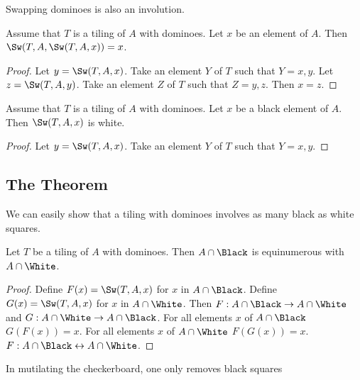 Swapping dominoes is also an involution.

\begin{forthel}
    \begin{lemma}
        Assume that $T$ is a tiling of $A$ with dominoes. Let $x$ be an element of $A$.
        Then $\Sw(T,A,\Sw(T,A,x)) = x$.
    \end{lemma}
    \begin{proof}
        Let $y = \Sw(T,A,x)$.
        Take an element $Y$ of $T$ such that $Y = {x,y}$.
        Let $z = \Sw(T,A,y)$.
        Take an element $Z$ of $T$ such that $Z = {y,z}$.
        Then $x = z$.
    \end{proof}

    \begin{lemma}
        Assume that $T$ is a tiling of $A$ with dominoes.
        Let $x$ be a black element of $A$.
        Then $\Sw(T,A,x)$ is white.
    \end{lemma}
    \begin{proof}
        Let $y = \Sw(T,A,x)$.
        Take an element $Y$ of $T$ such that $Y = {x,y}$.
    \end{proof}
\end{forthel}

\subsection{The Theorem}

\noindent We can easily show that a tiling with dominoes involves as many black as white squares.

\begin{forthel}
    \begin{lemma}
        Let $T$ be a tiling of $A$ with dominoes. Then $A \cap \Black$ is
        equinumerous with $A \cap \White$.
    \end{lemma}
    \begin{proof}
        Define $F(x) = \Sw(T,A,x)$ for $x$ in $A \cap \Black$.
        Define $G(x) = \Sw(T,A,x)$ for $x$ in $A \cap \White$.
        Then $F: A \cap \Black \to A \cap \White$ and
        $G: A \cap \White \to A \cap \Black$.
        For all elements $x$ of $A \cap \Black$ $G(F(x))=x$.
        For all elements $x$ of $A \cap \White$ $F(G(x))=x$.
        $F : A \cap \Black \leftrightarrow A \cap \White$.
    \end{proof}
\end{forthel}

\noindent In mutilating the checkerboard, one only removes black squares


